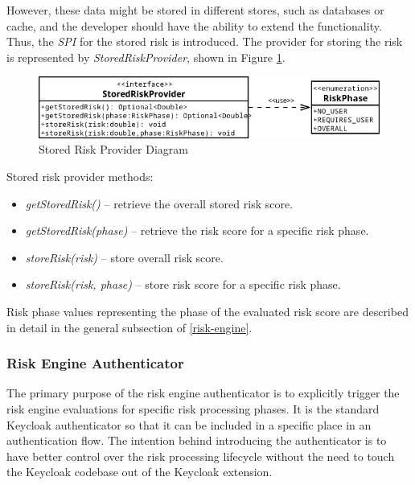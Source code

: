 However, these data might be stored in different stores, such as databases or cache, and the developer should have the ability to extend the functionality.
Thus, the \textit{SPI} for the stored risk is introduced.
The provider for storing the risk is represented by \textit{StoredRiskProvider}, shown in Figure \ref{fig:design-stored-risk-diagram}.

\begin{figure}[htbp]
  \centering
  \includegraphics[width=1\textwidth]{img/sections/5-design/stored-risk-provider.png}
  \caption{Stored Risk Provider Diagram}
  \label{fig:design-stored-risk-diagram}
\end{figure}

Stored risk provider methods:
\begin{itemize}
    \item \textit{getStoredRisk()} -- retrieve the overall stored risk score.
    \item \textit{getStoredRisk(phase)} -- retrieve the risk score for a specific risk phase.
    \item \textit{storeRisk(risk)} -- store overall risk score.
    \item \textit{storeRisk(risk, phase)} -- store risk score for a specific risk phase.
\end{itemize}

Risk phase values representing the phase of the evaluated risk score are described in detail in the general subsection of \ref{risk-engine}.

\newpage

\subsubsection{Risk Engine Authenticator}
The primary purpose of the risk engine authenticator is to explicitly trigger the risk engine evaluations for specific risk processing phases.
It is the standard Keycloak authenticator so that it can be included in a specific place in an authentication flow.
The intention behind introducing the authenticator is to have better control over the risk processing lifecycle without the need to touch the Keycloak codebase out of the Keycloak extension.

